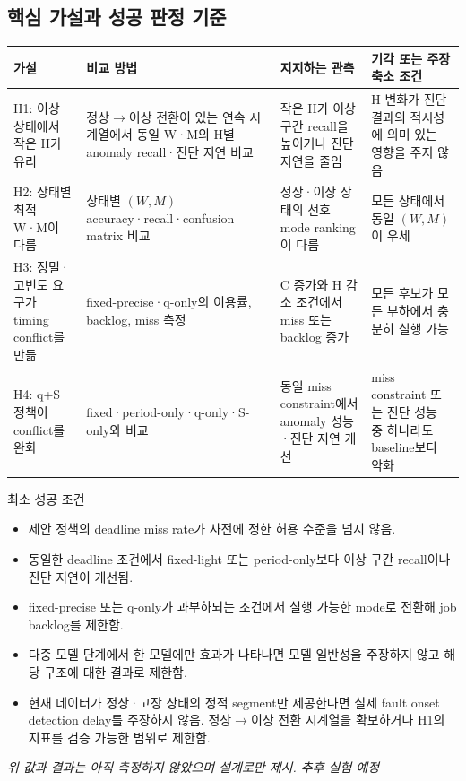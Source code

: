 \documentclass[10pt]{article}
\begin{document}
\subsection{핵심 가설과 성공 판정 기준}
\begin{center}\scriptsize
\begin{tabular}{@{}L{3.0cm}L{3.8cm}L{4.1cm}L{4.1cm}@{}}
\toprule
가설 & 비교 방법 & 지지하는 관측 & 기각 또는 주장 축소 조건 \\ \midrule
H1: 이상 상태에서 작은 H가 유리 & 정상$\rightarrow$이상 전환이 있는 연속 시계열에서 동일 W·M의 H별 anomaly recall·진단 지연 비교 & 작은 H가 이상 구간 recall을 높이거나 진단 지연을 줄임 & H 변화가 진단 결과의 적시성에 의미 있는 영향을 주지 않음 \\
H2: 상태별 최적 W·M이 다름 & 상태별 $(W,M)$ accuracy·recall·confusion matrix 비교 & 정상·이상 상태의 선호 mode ranking이 다름 & 모든 상태에서 동일 $(W,M)$이 우세 \\
H3: 정밀·고빈도 요구가 timing conflict를 만듦 & fixed-precise·q-only의 이용률, backlog, miss 측정 & C 증가와 H 감소 조건에서 miss 또는 backlog 증가 & 모든 후보가 모든 부하에서 충분히 실행 가능 \\
H4: q+S 정책이 conflict를 완화 & fixed·period-only·q-only·S-only와 비교 & 동일 miss constraint에서 anomaly 성능·진단 지연 개선 & miss constraint 또는 진단 성능 중 하나라도 baseline보다 악화 \\
\bottomrule
\end{tabular}
\end{center}
\noindent 최소 성공 조건
\begin{itemize}
\item 제안 정책의 deadline miss rate가 사전에 정한 허용 수준을 넘지 않음.
\item 동일한 deadline 조건에서 fixed-light 또는 period-only보다 이상 구간 recall이나 진단 지연이 개선됨.
\item fixed-precise 또는 q-only가 과부하되는 조건에서 실행 가능한 mode로 전환해 job backlog를 제한함.
\item 다중 모델 단계에서 한 모델에만 효과가 나타나면 모델 일반성을 주장하지 않고 해당 구조에 대한 결과로 제한함.
\item 현재 데이터가 정상·고장 상태의 정적 segment만 제공한다면 실제 fault onset detection delay를 주장하지 않음. 정상$\rightarrow$이상 전환 시계열을 확보하거나 H1의 지표를 검증 가능한 범위로 제한함.
\end{itemize}
\noindent\emph{위 값과 결과는 아직 측정하지 않았으며 설계로만 제시. 추후 실험 예정}
\end{document}
